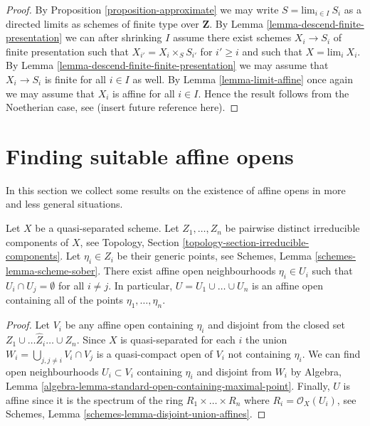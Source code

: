 \begin{proof}
\medskip\noindent
By Proposition \ref{proposition-approximate} we may write
$S = \text{lim}_{i \in I}\ S_i$ as
a directed limits as schemes of finite type over $\mathbf{Z}$.
By Lemma \ref{lemma-descend-finite-presentation} we can
after shrinking $I$ assume there exist schemes $X_i \to S_i$
of finite presentation such that $X_{i'} = X_i \times_S S_{i'}$
for $i' \geq i$ and such that $X = \text{lim}_i\ X_i$. By
Lemma \ref{lemma-descend-finite-finite-presentation} we may
assume that $X_i \to S_i$ is finite for all $i \in I$ as well.
By Lemma \ref{lemma-limit-affine} once again we may assume that $X_i$ is
affine for all $i \in I$. Hence the result follows from the
Noetherian case, see (insert future reference here).
\end{proof}















\section{Finding suitable affine opens}
\label{section-finding-affine-opens}

\noindent
In this section we collect some results on the existence of
affine opens in more and less general situations.

\begin{lemma}
\label{lemma-maximal-points-affine}
Let $X$ be a quasi-separated scheme.
Let $Z_1, \ldots, Z_n$ be pairwise distinct irreducible components of $X$,
see Topology, Section \ref{topology-section-irreducible-components}.
Let $\eta_i \in Z_i$ be their generic points, see
Schemes, Lemma \ref{schemes-lemma-scheme-sober}.
There exist affine open neighbourhoods $\eta_i \in U_i$
such that $U_i \cap U_j = \emptyset$ for all $i \not = j$.
In particular, $U = U_1 \cup \ldots \cup U_n$ is an affine
open containing all of the points $\eta_1, \ldots, \eta_n$.
\end{lemma}

\begin{proof}
Let $V_i$ be any affine open containing $\eta_i$
and disjoint from the closed set $Z_1 \cup \ldots \hat Z_i \ldots \cup Z_n$.
Since $X$ is quasi-separated for each $i$ the union
$W_i = \bigcup_{j, j \not = i} V_i \cap V_j$ is a quasi-compact
open of $V_i$ not containing $\eta_i$. 
We can find open neighbourhoods $U_i \subset V_i$
containing $\eta_i$ and disjoint from $W_i$ by
Algebra, Lemma \ref{algebra-lemma-standard-open-containing-maximal-point}.
Finally, $U$ is affine since it is the spectrum of
the ring $R_1 \times \ldots \times R_n$ where $R_i = \mathcal{O}_X(U_i)$,
see Schemes, Lemma \ref{schemes-lemma-disjoint-union-affines}.
\end{proof}

